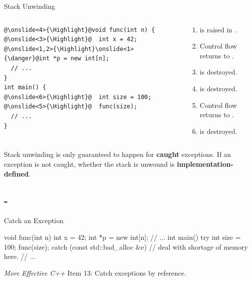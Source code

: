 \documentclass{beamer}
\newcommand{\Highlight}{\makebox[0pt][l]{\color{pink}\rule[-4pt]{\textwidth}{11pt}}}
\begin{document}
\begin{frame}[fragile]{Stack Unwinding}
  \begin{columns}
    \begin{column}{0.4\linewidth}
      \begin{lstlisting}[language = {[11]C++}, escapechar = \@]
@\onslide<4>{\Highlight}@void func(int n) {
@\onslide<3>{\Highlight}@  int x = 42;
@\onslide<1,2>{\Highlight}\onslide<1>{\danger}@int *p = new int[n];
  // ...
}
int main() {
@\onslide<6>{\Highlight}@  int size = 100;
@\onslide<5>{\Highlight}@  func(size);
  // ...
}
      \end{lstlisting}
    \end{column}
    \begin{column}{0.6\linewidth}
      \begin{enumerate}
        \item {} is raised in \ttt{[]}.
        \item Control flow returns to .
        \item {} is destroyed.
        \item {} is destroyed.
        \item Control flow returns to .
        \item {} is destroyed.
      \end{enumerate}
    \end{column}
  \end{columns}
  \begin{notice}
    Stack unwinding is only guaranteed to happen for \textbf{caught} exceptions. If an exception is not caught, whether the stack is unwound is \textbf{implementation-defined}.
  \end{notice}
\end{frame}

\subsection{-}

\begin{frame}[fragile]{Catch an Exception}
  \begin{cpp}
void func(int n) {
  int x = 42;
  int *p = new int[n];
  // ...
}
int main() {
  try {
    int size = 100;
    func(size);
  } catch (const std::bad_alloc &e) {
    // deal with shortage of memory here.
  }
  // ...
}
  \end{cpp}
  \textit{More Effective C++} Item 13: Catch exceptions by reference.
\end{frame}
\end{document}
